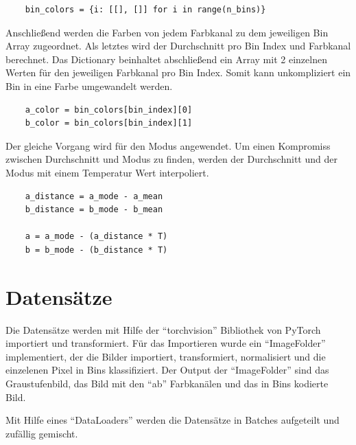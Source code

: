 \begin{listing}[H]
  \begin{verbatim}
    bin_colors = {i: [[], []] for i in range(n_bins)}
  \end{verbatim}
\end{listing}

Anschließend werden die Farben von jedem Farbkanal zu dem jeweiligen Bin Array zugeordnet. Als letztes wird der Durchschnitt pro Bin Index
und Farbkanal berechnet. Das Dictionary beinhaltet abschließend ein Array mit 2 einzelnen Werten für den jeweiligen Farbkanal pro Bin Index.
Somit kann unkompliziert ein Bin in eine Farbe umgewandelt werden.

\begin{listing}[H]
  \begin{verbatim}
    a_color = bin_colors[bin_index][0]
    b_color = bin_colors[bin_index][1]
  \end{verbatim}
\end{listing}

Der gleiche Vorgang wird für den Modus angewendet. Um einen Kompromiss zwischen Durchschnitt und Modus zu finden, werden der Durchschnitt 
und der Modus mit einem Temperatur Wert interpoliert.

\begin{listing}[H]
  \begin{verbatim}
    a_distance = a_mode - a_mean
    b_distance = b_mode - b_mean

    a = a_mode - (a_distance * T)
    b = b_mode - (b_distance * T)
  \end{verbatim}
\end{listing}

\section{Datensätze}
Die Datensätze werden mit Hilfe der ``torchvision'' Bibliothek von PyTorch importiert und transformiert. Für das Importieren wurde ein
``ImageFolder'' implementiert, der die Bilder importiert, transformiert, normalisiert und die einzelenen Pixel in Bins klassifiziert. 
Der Output der ``ImageFolder'' sind das Graustufenbild, das Bild mit den ``ab'' Farbkanälen und das in Bins kodierte Bild.

Mit Hilfe eines ``DataLoaders'' werden die Datensätze in Batches aufgeteilt und zufällig gemischt.

